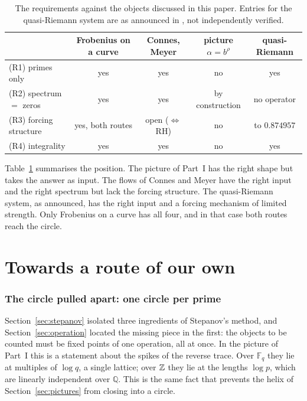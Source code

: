 \documentclass[11pt,a4paper]{article}
\theoremstyle{definition}\newtheorem{definition}[proposition]{Definition}
\theoremstyle{remark}\newtheorem{remark}[proposition]{Remark}
\begin{document}
\begin{table}[ht]\centering\small
\caption{The requirements against the objects discussed in this paper. Entries for the quasi-Riemann system are as announced in \cite{Liu2026}, not independently verified.}\label{tab:requirements}
\begin{tabular}{lcccc}
\toprule
 & Frobenius on a curve & Connes, Meyer & picture $\alpha=b^\rho$ & quasi-Riemann\\
\midrule
(R1) primes only & yes & yes & no & yes\\
(R2) spectrum $=$ zeros & yes & yes & by construction & no operator\\
(R3) forcing structure & yes, both routes & open ($\Leftrightarrow$ RH) & no & to $0.874957$\\
(R4) integrality & yes & yes & no & yes\\
\bottomrule
\end{tabular}
\end{table}

Table~\ref{tab:requirements} summarises the position. The picture of Part~I has the right shape but takes the answer as input. The flows of Connes and Meyer have the right input and the right spectrum but lack the forcing structure. The quasi-Riemann system, as announced, has the right input and a forcing mechanism of limited strength. Only Frobenius on a curve has all four, and in that case both routes reach the circle.

\part{Towards a route of our own}

\section{The circle pulled apart: one circle per prime}\label{sec:torus}
Section~\ref{sec:stepanov} isolated three ingredients of Stepanov's method, and Section~\ref{sec:operation} located the missing piece in the first: the objects to be counted must be fixed points of one operation, all at once. In the picture of Part~I this is a statement about the spikes of the reverse trace. Over $\mathbb F_q$ they lie at multiples of $\log q$, a single lattice; over $\mathbb Z$ they lie at the lengths $\log p$, which are linearly independent over $\mathbb Q$. This is the same fact that prevents the helix of Section~\ref{sec:pictures} from closing into a circle.
\end{document}
